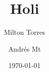 \documentclass[a5paper, 12pt]{article}
\author{Milton Torres \and Andrés Mt}
\title{Holi}
\date{\today}
\begin{document}
	\maketitle

	\lipsum
	
	
\nocite{*}

	
\end{document}
